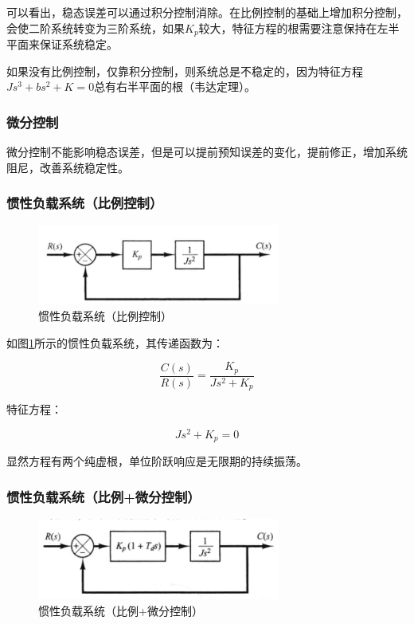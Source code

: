 可以看出，稳态误差可以通过积分控制消除。在比例控制的基础上增加积分控制，会使二阶系统转变为三阶系统，如果$K_p$较大，特征方程的根需要注意保持在左半平面来保证系统稳定。

如果没有比例控制，仅靠积分控制，则系统总是不稳定的，因为特征方程$Js^3+bs^2+K=0$总有右半平面的根（韦达定理）。


\subsubsection{微分控制}

微分控制不能影响稳态误差，但是可以提前预知误差的变化，提前修正，增加系统阻尼，改善系统稳定性。

\subsubsection{惯性负载系统（比例控制）}

\begin{figure}[!ht]
	\centering
	\includegraphics[width=8cm]{figures/17.png}
	\caption{惯性负载系统（比例控制）}
	\label{17}
\end{figure}

如图\ref{17}所示的惯性负载系统，其传递函数为：

\begin{equation*}
\frac{C(s)}{R(s)}=\frac{K_p}{Js^2+K_p}
\end{equation*}

特征方程：

\begin{equation*}
Js^2+K_p=0
\end{equation*}

显然方程有两个纯虚根，单位阶跃响应是无限期的持续振荡。

\subsubsection{惯性负载系统（比例+微分控制）}

\begin{figure}[!ht]
	\centering
	\includegraphics[width=8cm]{figures/18.png}
	\caption{惯性负载系统（比例+微分控制）}
	\label{18}
\end{figure}

